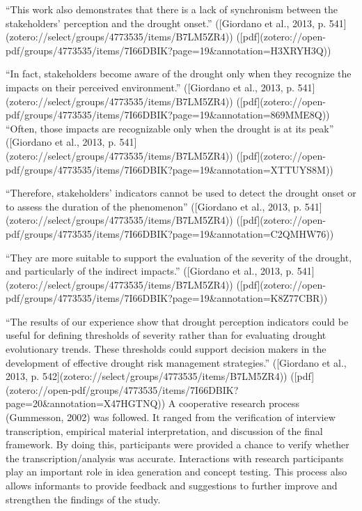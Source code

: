 “This work also demonstrates that there is a lack of synchronism between the stakeholders’ perception and the drought onset.” ([Giordano et al., 2013, p. 541](zotero://select/groups/4773535/items/B7LM5ZR4)) ([pdf](zotero://open-pdf/groups/4773535/items/7I66DBIK?page=19&annotation=H3XRYH3Q))

“In fact, stakeholders become aware of the drought only when they recognize the impacts on their perceived environment.” ([Giordano et al., 2013, p. 541](zotero://select/groups/4773535/items/B7LM5ZR4)) ([pdf](zotero://open-pdf/groups/4773535/items/7I66DBIK?page=19&annotation=869MME8Q))
“Often, those impacts are recognizable only when the drought is at its peak” ([Giordano et al., 2013, p. 541](zotero://select/groups/4773535/items/B7LM5ZR4)) ([pdf](zotero://open-pdf/groups/4773535/items/7I66DBIK?page=19&annotation=XTTUYS8M))

“Therefore, stakeholders’ indicators cannot be used to detect the drought onset or to assess the duration of the phenomenon” ([Giordano et al., 2013, p. 541](zotero://select/groups/4773535/items/B7LM5ZR4)) ([pdf](zotero://open-pdf/groups/4773535/items/7I66DBIK?page=19&annotation=C2QMHW76))

“They are more suitable to support the evaluation of the severity of the drought, and particularly of the indirect impacts.” ([Giordano et al., 2013, p. 541](zotero://select/groups/4773535/items/B7LM5ZR4)) ([pdf](zotero://open-pdf/groups/4773535/items/7I66DBIK?page=19&annotation=K8Z77CBR))

“The results of our experience show that drought perception indicators could be useful for defining thresholds of severity rather than for evaluating drought evolutionary trends. These thresholds could support decision makers in the development of effective drought risk management strategies.” ([Giordano et al., 2013, p. 542](zotero://select/groups/4773535/items/B7LM5ZR4)) ([pdf](zotero://open-pdf/groups/4773535/items/7I66DBIK?page=20&annotation=X47HGTNQ))
A cooperative research process (Gummesson, 2002) was followed. It ranged from the verification of interview transcription, empirical material interpretation, and discussion of the final framework. By doing this, participants were provided a chance to verify whether the transcription/analysis was accurate. Interactions with research participants play an important role in idea generation and concept testing. This process also allows informants to provide feedback and suggestions to further improve and strengthen the findings of the study.

